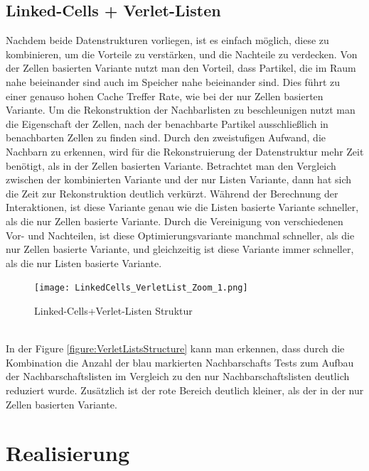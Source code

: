 \documentclass[
12pt,
a4paper,
BCOR10mm,
DIV14,
headsepline,
]{scrreprt}
\begin{document}
	\section{Linked-Cells + Verlet-Listen}%
	Nachdem beide Datenstrukturen vorliegen, ist es einfach möglich, diese zu kombinieren, um die Vorteile zu verstärken, und die Nachteile zu verdecken. Von der Zellen basierten Variante nutzt man den Vorteil, dass Partikel, die im Raum nahe beieinander sind auch im Speicher nahe beieinander sind. Dies führt zu einer genauso hohen Cache Treffer Rate, wie bei der nur Zellen basierten Variante. Um die Rekonstruktion der Nachbarlisten zu beschleunigen nutzt man die Eigenschaft der Zellen, nach der benachbarte Partikel ausschließlich in benachbarten Zellen zu finden sind. Durch den zweistufigen Aufwand, die Nachbarn zu erkennen, wird für die Rekonstruierung der Datenstruktur mehr Zeit benötigt, als in der Zellen basierten Variante. Betrachtet man den Vergleich zwischen der kombinierten Variante und der nur Listen Variante, dann hat sich die Zeit zur Rekonstruktion deutlich verkürzt. Während der Berechnung der Interaktionen, ist diese Variante genau wie die Listen basierte Variante schneller, als die nur Zellen basierte Variante. Durch die Vereinigung von verschiedenen Vor- und Nachteilen, ist diese Optimierungsvariante manchmal schneller, als die nur Zellen basierte Variante, und gleichzeitig ist diese Variante immer schneller, als die nur Listen basierte Variante.
	\begin{figure}[h]
		\centering
		\texttt{[image: LinkedCells\_VerletList\_Zoom\_1.png]}
		\caption{Linked-Cells+Verlet-Listen Struktur}
		\label{figure:LinkedCellsVerletListStructure}
	\end{figure}\\
	In der Figure \ref{figure:VerletListsStructure} kann man erkennen, dass durch die Kombination die Anzahl der blau markierten Nachbarschafts Tests zum Aufbau der Nachbarschaftslisten im Vergleich zu den nur Nachbarschaftslisten deutlich reduziert wurde. Zusätzlich ist der rote Bereich deutlich kleiner, als der in der nur Zellen basierten Variante.
	\chapter{Realisierung}%
	\label{Realisierung}%
\end{document}
